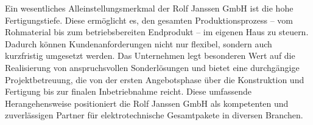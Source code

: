 Ein wesentliches Alleinstellungsmerkmal der Rolf Janssen GmbH ist die hohe Fertigungstiefe. Diese ermöglicht es, den gesamten Produktionsprozess – vom Rohmaterial bis zum betriebsbereiten Endprodukt – im eigenen Haus zu steuern. Dadurch können Kundenanforderungen nicht nur flexibel, sondern auch kurzfristig umgesetzt werden. Das Unternehmen legt besonderen Wert auf die Realisierung von anspruchsvollen Sonderlösungen und bietet eine durchgängige Projektbetreuung, die von der ersten Angebotsphase über die Konstruktion und Fertigung bis zur finalen Inbetriebnahme reicht. Diese umfassende Herangehensweise positioniert die Rolf Janssen GmbH als kompetenten und zuverlässigen Partner für elektrotechnische Gesamtpakete in diversen Branchen.

